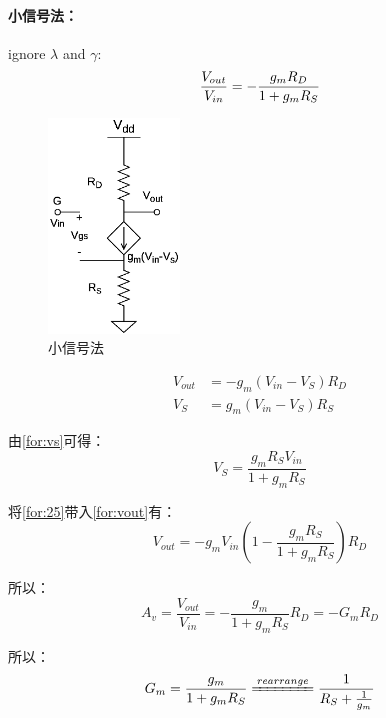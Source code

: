 \documentclass[twoside,a4paper,openright,titlepage,draft]{ctexrep}
\begin{document}
\paragraph{小信号法：}
ignore $\lambda$ and $\gamma$: 
\begin{equation}
    \frac{V_{out}}{V_{in}}=-\frac{g_mR_D}{1+g_mR_S} \notag
\end{equation}
\newpage
\begin{multicols}{2}
    \begin{figure}[H]
        \centering
        \includegraphics[width=35mm]{sourcedegenerationsmallsignal.eps}
        \caption{小信号法}
        \label{fig:小信号法}
    \end{figure}
    \columnbreak
    \begin{align}
        V_{out} &= -g_m(V_{in} - V_S)R_D \label{for:vout} \\
        V_S &= g_m(V_{in} - V_S)R_S \label{for:vs}
    \end{align}
\end{multicols}

由\ref{for:vs}可得：
\begin{equation}
    V_S = \frac{g_mR_SV_{in}}{1 + g_mR_S} \label{for:25}
\end{equation}

将\ref{for:25}带入\ref{for:vout}有：
\begin{equation}
    V_{out} = -g_mV_{in}(1 - \frac{g_mR_S}{1 + g_mR_S})R_D
\end{equation}

所以：
\begin{equation}
    A_v = \frac{V_{out}}{V_{in}} = -\frac{g_m}{1 + g_mR_S}R_D = -G_mR_D
\end{equation}

所以：
\begin{equation}
    G_m = \frac{g_m}{1+g_mR_S} \xlongequal{rearrange} \frac{1}{R_S + {1 \over g_m}}
\end{equation}
\end{document}
